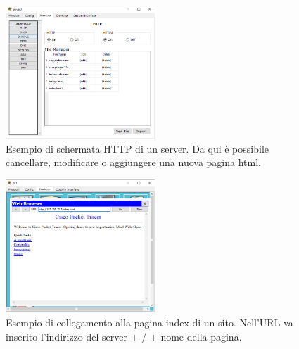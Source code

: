 \begin{figure}[h]
    \centering
    \includegraphics[width=0.5\textwidth]{images/06.04.01.png}
    \caption{Esempio di schermata HTTP di un server. Da qui è possibile cancellare, modificare o aggiungere una nuova pagina html.}
    \label{fig:http-conf}
\end{figure}

\begin{figure}[h]
    \centering
    \includegraphics[width=0.5\textwidth]{images/06.04.02.png}
    \caption{Esempio di collegamento alla pagina index di un sito. Nell’URL va inserito l’indirizzo del server + / + nome della pagina.}
    \label{fig:http-test}
\end{figure}